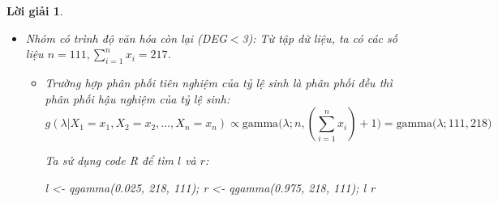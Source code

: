 \documentclass[14pt, a4paper]{article}
\theoremstyle{sltheorem}
\theoremstyle{soltheorem}
\newtheorem*{loigiai}{Lời giải}
\begin{document}
\begin{loigiai}
\begin{enumerate}
\begin{itemize}
\begin{itemize}
\begin{itemize}
                \begin{python}
l <- qgamma(0.025, 67, 44);
r <- qgamma(0.975, 67, 44);
l
r
                \end{python}

                Ta thu được $l\approx 1.1801, r\approx1.9084$.
                Vậy khoảng tin cậy cho tỷ lệ sinh với độ tin cậy 0.95 là $(1.1801;1.9084)$.
                \item Trường hợp phân phối tiên nghiệm của tỷ lệ sinh là phân phối gamma $g(\lambda) = \text{gamma}(\lambda; r, \alpha)=\text{gamma}(\lambda; 2, 10)$ thì phân phối hậu nghiệm của tỷ lệ sinh là:
                \begin{equation*}
                    g(\lambda \vert X_1 =x_1, X_2=x_2, \dots, X_n=x_n) = \text{gamma}\big(\lambda; 46, 76 \big)
                \end{equation*}

                Ta sử dụng code R để tìm $l$ và $r$:

                \begin{python}
l <- qgamma(0.025, 76, 46);
r <- qgamma(0.975, 76, 46);
l
r
                \end{python}

                Ta thu được $l\approx 1.3017, r\approx2.0438$.
                Vậy khoảng tin cậy cho tỷ lệ sinh với độ tin cậy 0.95 là $(1.3017;2.0438)$.
            \end{itemize}
            \item Nhóm có trình độ văn hóa còn lại (DEG$<$3):
            Từ tập dữ liệu, ta có các số liệu $n=111, \sum_{i=1}^n x_i=217$.
            \begin{itemize}
                \item Trường hợp phân phối tiên nghiệm của tỷ lệ sinh là phân phối đều thì phân phối hậu nghiệm của tỷ lệ sinh:
                \begin{equation*}
                    g(\lambda \vert X_1 =x_1, X_2=x_2, \dots, X_n=x_n) \propto \text{gamma}\big(\lambda; n, (\sum_{i=1}^n x_i) + 1\big) = \text{gamma}\big(\lambda; 111, 218\big)
                \end{equation*}

                Ta sử dụng code R để tìm $l$ và $r$:

                \begin{python}
l <- qgamma(0.025, 218, 111);
r <- qgamma(0.975, 218, 111);
l
r
                \end{python}


\end{itemize}
\end{itemize}
\end{itemize}
\end{enumerate}
\end{loigiai}
\end{document}
